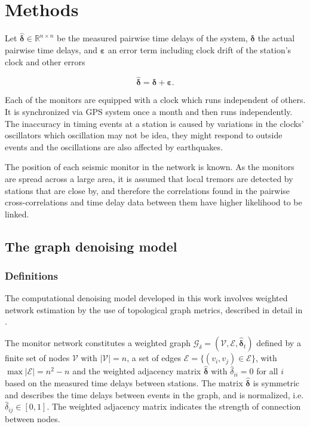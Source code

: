 \documentclass[12pt, sumlimits, intlimits]{article}
\begin{document}
\section{Methods}

Let $\bm{\hat{\delta}} \in \mathbb{R}^{n\times n}$ be the measured pairwise time delays of the system, $\bm{\delta}$ the actual pairwise time delays, and $\bm{\varepsilon}$ an error term including clock drift of the station's clock and other errors

\begin{equation}
\bm{\hat{\delta}}  = \bm{\delta} + \bm{\varepsilon}.
\label{eq:model}
\end{equation}

Each of the monitors are equipped with a clock which runs independent of others. It is synchronized via GPS system once a month and then runs independently. The inaccuracy in timing events at a station is caused by variations in the clocks' oscillators which oscillation may not be idea, they might respond to outside events and the oscillations are also affected by earthquakes. 

The position of each seismic monitor in the network is known. As the monitors are spread across a large area, it is assumed that local tremors are detected by stations that are close by, and therefore the correlations found in the pairwise cross-correlations and time delay data between them have higher likelihood to be linked. 

\subsection{The graph denoising model}\label{sec:denoising}
\subsubsection{Definitions}
The computational denoising model developed in this work involves weighted network estimation by the use of topological graph metrics, described in detail in \cite{Spyrou2017}. 

The monitor network constitutes a weighted graph $\mathcal{G}_{\delta} = (\mathcal{V}, \mathcal{E}, \bm{\hat{\delta}}_t)$ defined by a finite set of nodes $\mathcal{V}$ with $|\mathcal{V}| = n$, a set of edges $\mathcal{E} = \{ (v_i,v_j) \in \mathcal{E} \}$, with $\max |\mathcal{E}| = n^2-n$ and the weighted adjacency matrix $\bm{\hat{\delta}}$ with $\hat{\delta}_{ii} = 0$ for all $i$ based on the measured time delays between stations. The matrix $\bm{\hat{\delta}}$  is symmetric and describes the time delays between events in the graph, and is normalized, i.e. $\hat{\delta}_{ij}\in [0,1]$. The weighted adjacency matrix indicates the strength of connection between nodes.
\end{document}
